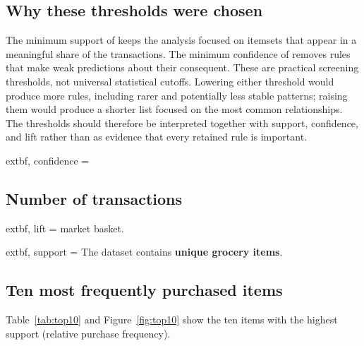 \documentclass[12pt,a4paper]{article}
\begin{document}

\tableofcontents
\newpage
{}

\subsection{Why these thresholds were chosen}
The minimum support of \textbf{\MinSupport} keeps the analysis focused on itemsets that
appear in a meaningful share of the \TransactionCount transactions. The minimum confidence
of \textbf{\MinConfidence} removes rules that make weak predictions about their consequent.
These are practical screening thresholds, not universal statistical cutoffs. Lowering either
threshold would produce more rules, including rarer and potentially less stable patterns;
raising them would produce a shorter list focused on the most common relationships. The
thresholds should therefore be interpreted together with support, confidence, and lift rather
than as evidence that every retained rule is important.


	extbf{\TopConfidenceRule}, confidence = \textbf{\TopConfidenceValue}

\subsection{Number of transactions}
	extbf{\TopLiftRule}, lift = \textbf{\TopLiftValue}
market basket.

	extbf{\TopSupportRule}, support = \textbf{\TopSupportValue}
The dataset contains \textbf{\UniqueItemCount unique grocery items}.

\subsection{Ten most frequently purchased items}

Table~\ref{tab:top10} and Figure~\ref{fig:top10} show the ten items with the highest support
(relative purchase frequency).
\end{document}
